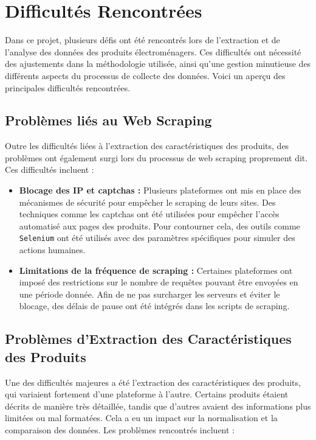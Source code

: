 \documentclass[a4paper, 12pt, oneside]{report}
\begin{document}
\chapter{Difficultés Rencontrées}

Dans ce projet, plusieurs défis ont été rencontrés lors de l'extraction et de l'analyse des données des produits électroménagers. Ces difficultés ont nécessité des ajustements dans la méthodologie utilisée, ainsi qu'une gestion minutieuse des différents aspects du processus de collecte des données. Voici un aperçu des principales difficultés rencontrées.

\section{Problèmes liés au Web Scraping}

Outre les difficultés liées à l'extraction des caractéristiques des produits, des problèmes ont également surgi lors du processus de web scraping proprement dit. Ces difficultés incluent :

\begin{itemize}
    \item \textbf{Blocage des IP et captchas :} Plusieurs plateformes ont mis en place des mécanismes de sécurité pour empêcher le scraping de leurs sites. Des techniques comme les captchas ont été utilisées pour empêcher l'accès automatisé aux pages des produits. Pour contourner cela, des outils comme \texttt{Selenium} ont été utilisés avec des paramètres spécifiques pour simuler des actions humaines.
    \item \textbf{Limitations de la fréquence de scraping :} Certaines plateformes ont imposé des restrictions sur le nombre de requêtes pouvant être envoyées en une période donnée. Afin de ne pas surcharger les serveurs et éviter le blocage, des délais de pause ont été intégrés dans les scripts de scraping.
\end{itemize}

\section{Problèmes d'Extraction des Caractéristiques des Produits}

Une des difficultés majeures a été l'extraction des caractéristiques des produits, qui variaient fortement d'une plateforme à l'autre. Certains produits étaient décrits de manière très détaillée, tandis que d'autres avaient des informations plus limitées ou mal formatées. Cela a eu un impact sur la normalisation et la comparaison des données. Les problèmes rencontrés incluent :
\end{document}
